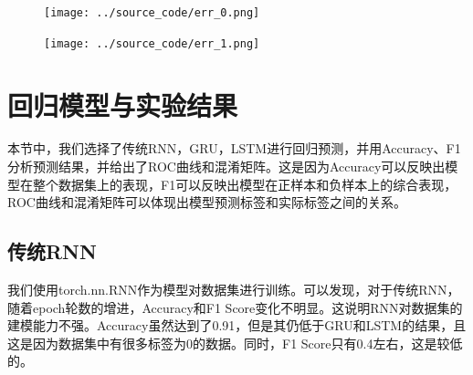 \documentclass[UTF8]{article}
\begin{document}
\begin{figure}[h]
    \centering
    \begin{minipage}{.43\linewidth}
        \centering
        \texttt{[image: ../source\_code/err\_0.png]}
    \end{minipage}
    \begin{minipage}{.43\linewidth}
        \centering
        \texttt{[image: ../source\_code/err\_1.png]}
    \end{minipage}
\end{figure}

\section{回归模型与实验结果}
本节中，我们选择了传统RNN，GRU，LSTM进行回归预测，并用Accuracy、F1分析预测结果，并给出了ROC曲线和混淆矩阵。这是因为Accuracy可以反映出模型在整个数据集上的表现，F1可以反映出模型在正样本和负样本上的综合表现，ROC曲线和混淆矩阵可以体现出模型预测标签和实际标签之间的关系。

\subsection{传统RNN}
我们使用torch.nn.RNN作为模型对数据集进行训练。可以发现，对于传统RNN，随着epoch轮数的增进，Accuracy和F1 Score变化不明显。这说明RNN对数据集的建模能力不强。Accuracy虽然达到了0.91，但是其仍低于GRU和LSTM的结果，且这是因为数据集中有很多标签为0的数据。同时，F1 Score只有0.4左右，这是较低的。
\end{document}
